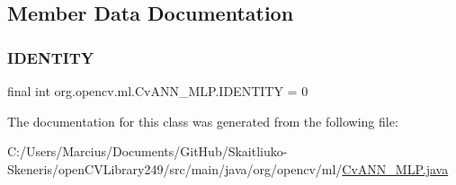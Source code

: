 \subsection{Member Data Documentation}
\mbox{\label{classorg_1_1opencv_1_1ml_1_1_cv_a_n_n___m_l_p_aefd633244286d7dfa041049f7a21d1c0}} 
\subsubsection{\texorpdfstring{I\+D\+E\+N\+T\+I\+TY}{IDENTITY}}
{\footnotesize\ttfamily final int org.\+opencv.\+ml.\+Cv\+A\+N\+N\+\_\+\+M\+L\+P.\+I\+D\+E\+N\+T\+I\+TY = 0\hspace{0.3cm}{\ttfamily [static]}}



The documentation for this class was generated from the following file\+:\begin{DoxyCompactItemize}
\item 
C\+:/\+Users/\+Marcius/\+Documents/\+Git\+Hub/\+Skaitliuko-\/\+Skeneris/open\+C\+V\+Library249/src/main/java/org/opencv/ml/\mbox{\hyperlink{_cv_a_n_n___m_l_p_8java}{Cv\+A\+N\+N\+\_\+\+M\+L\+P.\+java}}\end{DoxyCompactItemize}
